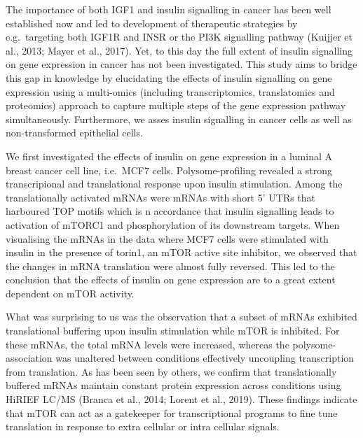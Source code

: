 \documentclass[
  12pt,
  openany]{book}
\begin{document}
The importance of both IGF1 and insulin signalling in cancer has been well established now and led to development of therapeutic strategies by e.g.~targeting both IGF1R and INSR or the PI3K signalling pathway (Kuijjer et al., 2013; Mayer et al., 2017). Yet, to this day the full extent of insulin signalling on gene expression in cancer has not been investigated. This study aims to bridge this gap in knowledge by elucidating the effects of insulin signalling on gene expression using a multi-omics (including transcriptomics, translatomics and proteomics) approach to capture multiple steps of the gene expression pathway simultaneously. Furthermore, we asses insulin signalling in cancer cells as well as non-transformed epithelial cells.

We first investigated the effects of insulin on gene expression in a luminal A breast cancer cell line, i.e.~MCF7 cells. Polysome-profiling revealed a strong transcripional and translational response upon insulin stimulation. Among the translationally activated mRNAs were mRNAs with short 5' UTRs that harboured TOP motifs which is n accordance that insulin signalling leads to activation of mTORC1 and phosphorylation of its downstream targets. When visualising the mRNAs in the data where MCF7 cells were stimulated with insulin in the presence of torin1, an mTOR active site inhibitor, we observed that the changes in mRNA translation were almost fully reversed. This led to the conclusion that the effects of insulin on gene expression are to a great extent dependent on mTOR activity.

What was surprising to us was the observation that a subset of mRNAs exhibited translational buffering upon insulin stimulation while mTOR is inhibited. For these mRNAs, the total mRNA levels were increased, whereas the polysome-association was unaltered between conditions effectively uncoupling transcription from translation. As has been seen by others, we confirm that translationally buffered mRNAs maintain constant protein expression across conditions using HiRIEF LC/MS (Branca et al., 2014; Lorent et al., 2019). These findings indicate that mTOR can act as a gatekeeper for transcriptional programs to fine tune translation in response to extra cellular or intra cellular signals.
\end{document}
